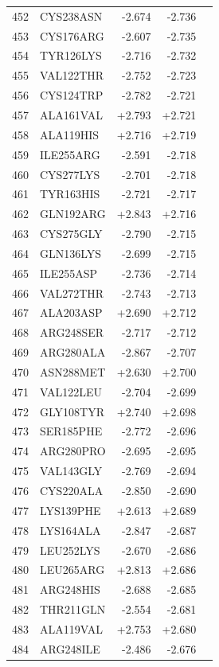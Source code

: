 \begin{longtable}{r l r r c}
452 & CYS238ASN & -2.674 & -2.736 &  \\
453 & CYS176ARG & -2.607 & -2.735 &  \\
454 & TYR126LYS & -2.716 & -2.732 &  \\
455 & VAL122THR & -2.752 & -2.723 &  \\
456 & CYS124TRP & -2.782 & -2.721 &  \\
457 & ALA161VAL & +2.793 & +2.721 &  \\
458 & ALA119HIS & +2.716 & +2.719 &  \\
459 & ILE255ARG & -2.591 & -2.718 &  \\
460 & CYS277LYS & -2.701 & -2.718 &  \\
461 & TYR163HIS & -2.721 & -2.717 &  \\
462 & GLN192ARG & +2.843 & +2.716 &  \\
463 & CYS275GLY & -2.790 & -2.715 &  \\
464 & GLN136LYS & -2.699 & -2.715 &  \\
465 & ILE255ASP & -2.736 & -2.714 &  \\
466 & VAL272THR & -2.743 & -2.713 &  \\
467 & ALA203ASP & +2.690 & +2.712 &  \\
468 & ARG248SER & -2.717 & -2.712 &  \\
469 & ARG280ALA & -2.867 & -2.707 &  \\
470 & ASN288MET & +2.630 & +2.700 &  \\
471 & VAL122LEU & -2.704 & -2.699 &  \\
472 & GLY108TYR & +2.740 & +2.698 &  \\
473 & SER185PHE & -2.772 & -2.696 &  \\
474 & ARG280PRO & -2.695 & -2.695 &  \\
475 & VAL143GLY & -2.769 & -2.694 &  \\
476 & CYS220ALA & -2.850 & -2.690 &  \\
477 & LYS139PHE & +2.613 & +2.689 &  \\
478 & LYS164ALA & -2.847 & -2.687 &  \\
479 & LEU252LYS & -2.670 & -2.686 &  \\
480 & LEU265ARG & +2.813 & +2.686 &  \\
481 & ARG248HIS & -2.688 & -2.685 &  \\
482 & THR211GLN & -2.554 & -2.681 &  \\
483 & ALA119VAL & +2.753 & +2.680 &  \\
484 & ARG248ILE & -2.486 & -2.676 &  \\

\end{longtable}
